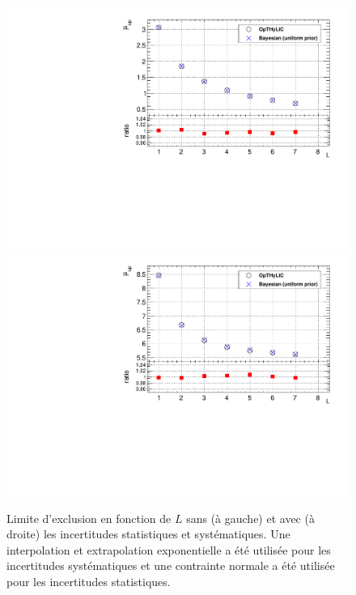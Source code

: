 \begin{figure}[!htb]
\begin{center}
\hspace*{-1.3cm}
\includegraphics[scale=0.42]{figures/SingleChannelForComparisonWithUncertaintiesOnBkg.pdf}
\includegraphics[scale=0.42]{figures/SingleChannelWithUncertaintiesOnBkg.pdf}
\caption{Limite d'exclusion en fonction de $L$ sans (\`a gauche) et avec (\`a droite) les incertitudes statistiques et syst\'ematiques. Une interpolation et extrapolation exponentielle a \'et\'e utilis\'ee pour les incertitudes syst\'ematiques et une contrainte normale a \'et\'e utilis\'ee pour les incertitudes statistiques.\label{fig:ExampleValidUncert}}
\end{center}
\end{figure}

